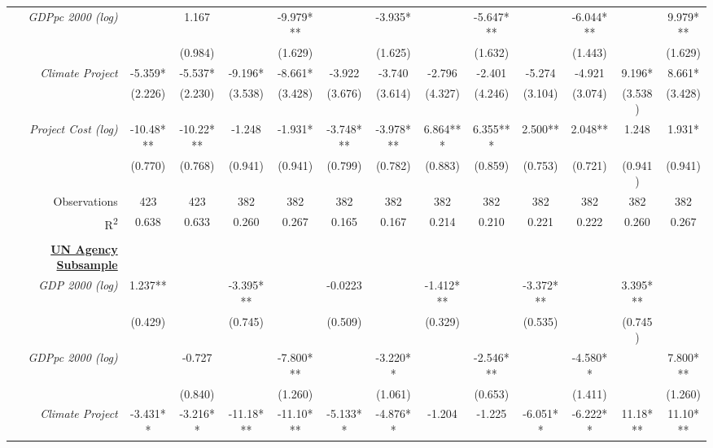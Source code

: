 \documentclass{article}
\begin{document}
\begin{singlespace}
\begin{landscape}
\begin{table}[H]
{\begin{tabular}{rcccccccccccc}
					\textit{GDPpc 2000 (log)} &  & 1.167 &  & -9.979*** &  & -3.935* &  & -5.647*** &  & -6.044*** &  & 9.979*** \\
					\textit{} &  & (0.984) &  & (1.629) &  & (1.625) &  & (1.632) &  & (1.443) &  & (1.629) \\
					\textit{Climate Project} & -5.359* & -5.537* & -9.196* & -8.661* & -3.922 & -3.740 & -2.796 & -2.401 & -5.274 & -4.921 & 9.196* & 8.661* \\
					\textit{} & (2.226) & (2.230) & (3.538) & (3.428) & (3.676) & (3.614) & (4.327) & (4.246) & (3.104) & (3.074) & (3.538) & (3.428) \\
					\textit{Project Cost (log)} & -10.48*** & -10.22*** & -1.248 & -1.931* & -3.748*** & -3.978*** & 6.864*** & 6.355*** & 2.500** & 2.048** & 1.248 & 1.931* \\
					\textit{} & (0.770) & (0.768) & (0.941) & (0.941) & (0.799) & (0.782) & (0.883) & (0.859) & (0.753) & (0.721) & (0.941) & (0.941) \\ \hline
					Observations & 423 & 423 & 382 & 382 & 382 & 382 & 382 & 382 & 382 & 382 & 382 & 382 \\
					R\textsuperscript{2} & 0.638 & 0.633 & 0.260 & 0.267 & 0.165 & 0.167 & 0.214 & 0.210 & 0.221 & 0.222 & 0.260 & 0.267 \\ \hline
					\multicolumn{1}{l}{\textit{}} & \multicolumn{1}{l}{} & \multicolumn{1}{l}{} & \multicolumn{1}{l}{} & \multicolumn{1}{l}{} & \multicolumn{1}{l}{} & \multicolumn{1}{l}{} & \multicolumn{1}{l}{} & \multicolumn{1}{l}{} & \multicolumn{1}{l}{} & \multicolumn{1}{l}{} & \multicolumn{1}{l}{} & \multicolumn{1}{l}{} \\
					{\ul \textbf{UN Agency Subsample}} &  &  &  &  &  &  &  &  &  &  &  &  \\
					\textit{GDP 2000 (log)} & 1.237** &  & -3.395*** &  & -0.0223 &  & -1.412*** &  & -3.372*** &  & 3.395*** &  \\
					\textit{} & (0.429) &  & (0.745) &  & (0.509) &  & (0.329) &  & (0.535) &  & (0.745) &  \\
					\textit{GDPpc 2000 (log)} &  & -0.727 &  & -7.800*** &  & -3.220** &  & -2.546*** &  & -4.580** &  & 7.800*** \\
					\textit{} &  & (0.840) &  & (1.260) &  & (1.061) &  & (0.653) &  & (1.411) &  & (1.260) \\
					\textit{Climate Project} & -3.431** & -3.216** & -11.18*** & -11.10*** & -5.133** & -4.876** & -1.204 & -1.225 & -6.051** & -6.222** & 11.18*** & 11.10*** \\

\end{tabular}}
\end{table}
\end{landscape}
\end{singlespace}
\end{document}
